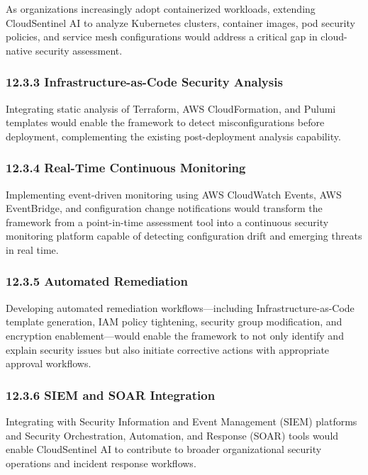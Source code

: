 As organizations increasingly adopt containerized workloads, extending CloudSentinel AI to analyze Kubernetes clusters, container images, pod security policies, and service mesh configurations would address a critical gap in cloud-native security assessment.

\subsubsection{12.3.3 Infrastructure-as-Code Security Analysis}

Integrating static analysis of Terraform, AWS CloudFormation, and Pulumi templates would enable the framework to detect misconfigurations before deployment, complementing the existing post-deployment analysis capability.

\subsubsection{12.3.4 Real-Time Continuous Monitoring}

Implementing event-driven monitoring using AWS CloudWatch Events, AWS EventBridge, and configuration change notifications would transform the framework from a point-in-time assessment tool into a continuous security monitoring platform capable of detecting configuration drift and emerging threats in real time.

\subsubsection{12.3.5 Automated Remediation}

Developing automated remediation workflows---including Infrastructure-as-Code template generation, IAM policy tightening, security group modification, and encryption enablement---would enable the framework to not only identify and explain security issues but also initiate corrective actions with appropriate approval workflows.

\subsubsection{12.3.6 SIEM and SOAR Integration}

Integrating with Security Information and Event Management (SIEM) platforms and Security Orchestration, Automation, and Response (SOAR) tools would enable CloudSentinel AI to contribute to broader organizational security operations and incident response workflows.

